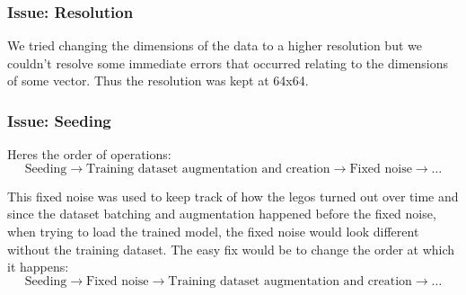 \documentclass[]{article}
\begin{document}
\subsubsection*{Issue: Resolution}
We tried changing the dimensions of the data to a higher resolution but we couldn't resolve some immediate errors that occurred relating
to the dimensions of some vector. Thus the resolution was kept at 64x64.

\subsubsection*{Issue: Seeding}
Heres the order of operations:
$$
\text{Seeding}
\rightarrow
\text{Training dataset augmentation and creation}
\rightarrow
\text{Fixed noise}
\rightarrow \dots
$$

\noindent This fixed noise was used to keep track of how the legos turned
out over time and since the dataset batching and augmentation happened before
the fixed noise, when trying to load the trained model, the fixed noise would look
different without the training dataset. The easy fix would be to change the order
at which it happens:
$$
\text{Seeding}
\rightarrow
\text{Fixed noise}
\rightarrow
\text{Training dataset augmentation and creation}
\rightarrow \dots
$$
\newpage
\end{document}

